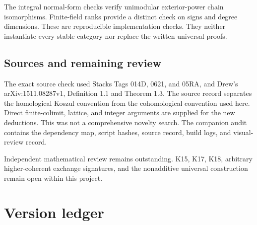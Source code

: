 \documentclass[11pt]{article}
\theoremstyle{definition}
\theoremstyle{remark}
\begin{document}
The integral normal-form checks verify unimodular exterior-power chain isomorphisms. Finite-field ranks provide a distinct check on signs and degree dimensions. These are reproducible implementation checks. They neither instantiate every stable category nor replace the written universal proofs.

\subsection{Sources and remaining review}
The exact source check used Stacks Tags 014D, 0621, and 05RA, and Drew's arXiv:1511.08287v1, Definition 1.1 and Theorem 1.3. The source record separates the homological Koszul convention from the cohomological convention used here. Direct finite-colimit, lattice, and integer arguments are supplied for the new deductions. This was not a comprehensive novelty search. The companion audit contains the dependency map, script hashes, source record, build logs, and visual-review record.

Independent mathematical review remains outstanding. K15, K17, K18, arbitrary higher-coherent exchange signatures, and the nonadditive universal construction remain open within this project.

\clearpage
\section{Version ledger}
\end{document}
